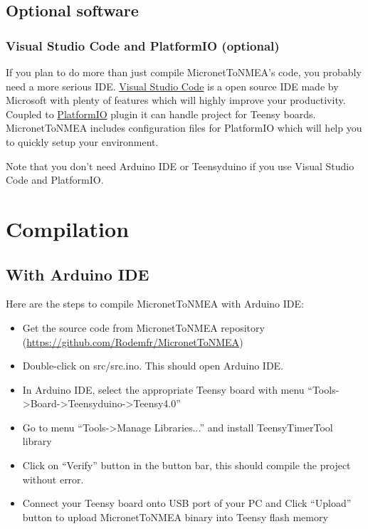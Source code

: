 \documentclass{report}
\begin{document}
\section{Optional software}

\subsection{Visual Studio Code and PlatformIO (optional)}

If you plan to do more than just compile MicronetToNMEA’s code, you probably need a more serious IDE. \href{https://code.visualstudio.com/}{Visual Studio Code} is a open source IDE made by Microsoft with plenty of features which will highly improve your productivity. Coupled to \href{https://platformio.org/}{PlatformIO} plugin it can handle project for Teensy boards. MicronetToNMEA includes configuration files for PlatformIO which will help you to quickly setup your environment.

Note that you don't need Arduino IDE or Teensyduino if you use Visual Studio Code and PlatformIO.

\chapter{Compilation}

\section{With Arduino IDE}

Here are the steps to compile MicronetToNMEA with Arduino IDE:

\begin{itemize}
\item Get the source code from MicronetToNMEA repository (\url{https://github.com/Rodemfr/MicronetToNMEA})
\item Double-click on src/src.ino. This should open Arduino IDE.
\item In Arduino IDE, select the appropriate Teensy board with menu “Tools->Board->Teensyduino->Teensy4.0”
\item Go to menu “Tools->Manage Libraries...” and install TeensyTimerTool library
\item Click on “Verify” button in the button bar, this should compile the project without error.
\item Connect your Teensy board onto USB port of your PC and Click “Upload” button to upload MicronetToNMEA binary into Teensy flash memory
\end{itemize}
\end{document}
